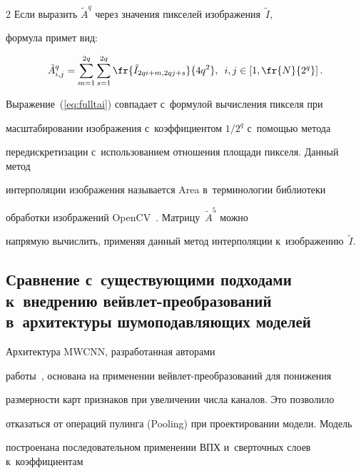 \begin{multicols}{2}
Если выразить $\tilde{A}^q$ через значения пикселей изоб\-ра\-же\-ния~$\tilde{I}$, 


формула примет вид:


\begin{equation}


\label{eq:fulltai}


\tilde{A}_{i,j}^q = \sum\limits_{m=1}^{2q}\sum\limits_{s=1}^{2q}\fr{\tilde{I}_{2qi+m, 


2qj+s}}{4q^2},\enskip i,j \in \left[1, \fr{N}{2^q}\right].


\end{equation}





Выражение~(\ref{eq:fulltai}) совпадает с~формулой вычисления пикселя при 


масштабировании изображения с~коэффициентом ${1}/{2^q}$ с~по\-мощью метода 


передискретизации с~использованием отношения площади пикселя. Данный метод 


интерполяции изображения называется {Area} в~терминологии библиотеки 


обработки изображений OpenCV~\cite{OPENCV_LIB}. Матрицу~$\tilde{A}^5$ можно 


напрямую вычислить, применяя данный метод интерполяции к~изображению~$\tilde{I}$.








\subsection{Сравнение с~существующими подходами к~внедрению вейвлет-преобразований в~архитектуры шумоподавляющих моделей}





Архитектура MWCNN, разработанная авторами 


работы~\cite{MWCNN}, основана на применении вейв\-лет-пре\-обра\-зо\-ва\-ний для понижения 


размерности карт признаков при увеличении числа каналов. Это позволило 


отказаться от операций пулинга (Pooling) при проектировании модели. Модель 


построена\linebreak на последовательном применении ВПХ и~сверточных слоев к~коэффициентам 



\end{multicols}
